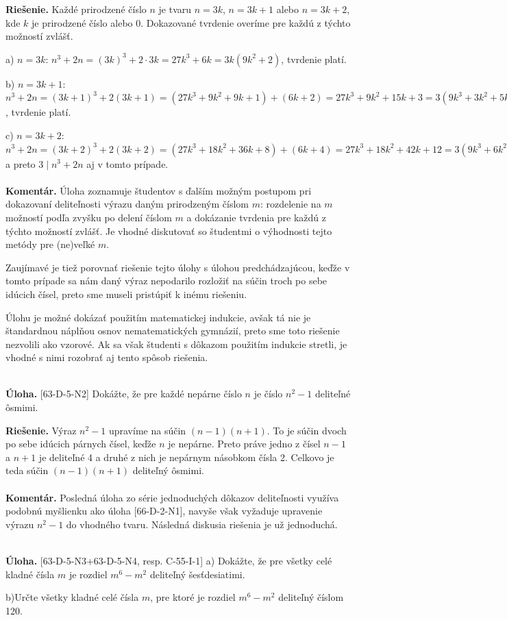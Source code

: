 \documentclass[11pt,a4paper,oneside,final]{book}
\newcommand{\kom}{\textbf{Komentár.} }
\newcommand{\ul}{\textbf{Úloha.} }
\newcommand{\rie}{\textbf{Riešenie.} }
\begin{document}
\rie Každé prirodzené číslo $n$ je tvaru $n=3k$, $n=3k+1$ alebo $n=3k+2$, kde $k$ je prirodzené číslo alebo 0. Dokazované tvrdenie overíme pre každú z týchto možností zvlášť.

a) $n=3k$: $n^3+2n=(3k)^3+2\cdot 3k=27k^3+6k=3k(9k^2+2)$, tvrdenie platí.

b) $n=3k+1$: $n^3+2n=(3k+1)^3+2(3k+1)=(27k^3+9k^2+9k+1)+(6k+2)=27k^3+9k^2+15k+3=3(9k^3+3k^2+5k+1)$, tvrdenie platí.

c) $n=3k+2$: $n^3+2n=(3k+2)^3+2(3k+2)=(27k^3+18k^2+36k+8)+(6k+4)=27k^3+18k^2+42k+12=3(9k^3+6k^2+14k+4)$ a preto $3\mid n^3+2n$ aj v tomto prípade.\\
\\
\kom Úloha zoznamuje študentov s ďalším možným postupom pri dokazovaní deliteľnosti výrazu daným prirodzeným číslom $m$: rozdelenie na $m$ možností podľa zvyšku po delení číslom $m$ a dokázanie tvrdenia pre každú z týchto možností zvlášť. Je vhodné diskutovať so študentmi o výhodnosti tejto metódy pre (ne)veľké $m$.

Zaujímavé je tiež porovnať riešenie tejto úlohy s úlohou predchádzajúcou, keďže v tomto prípade sa nám daný výraz nepodarilo rozložiť na súčin troch po sebe idúcich čísel, preto sme museli pristúpiť k inému riešeniu.

Úlohu je možné dokázať použitím matematickej indukcie, avšak tá nie je štandardnou náplňou osnov nematematických gymnázií, preto sme toto riešenie nezvolili ako vzorové. Ak sa však študenti s dôkazom použitím indukcie stretli, je vhodné s nimi rozobrať aj tento spôsob riešenia.\\
\\
\begin{tcolorbox}[breakable,notitle,boxrule=0pt,colback=light-gray,colframe=light-gray]\ul [63-D-5-N2] Dokážte, že pre každé nepárne číslo $n$ je číslo $n^2 - 1$ deliteľné ôsmimi.

\end{tcolorbox}

\rie Výraz $n^2-1$ upravíme na súčin $(n-1)(n+1)$. To je súčin dvoch po sebe idúcich párnych čísel, keďže $n$ je nepárne. Preto práve jedno z čísel $n-1$ a $n+1$ je deliteľné 4 a druhé z nich je nepárnym násobkom čísla 2. Celkovo je teda súčin $(n-1)(n+1)$ deliteľný ôsmimi.\\
\\
\kom Posledná úloha zo série jednoduchých dôkazov deliteľnosti využíva podobnú myšlienku ako úloha [66-D-2-N1], navyše však vyžaduje upravenie výrazu $n^2-1$ do vhodného tvaru. Následná diskusia riešenia je už jednoduchá.\\
\\
\begin{tcolorbox}[breakable,notitle,boxrule=0pt,colback=light-gray,colframe=light-gray]\ul [63-D-5-N3+63-D-5-N4, resp. C-55-I-1] a) Dokážte, že pre všetky celé kladné čísla $m$ je rozdiel $m^6 - m^2$ deliteľný šesťdesiatimi.

b)Určte všetky kladné celé čísla $m$, pre ktoré je rozdiel $m^6 - m^2$ deliteľný číslom 120.

\end{tcolorbox}
\end{document}
